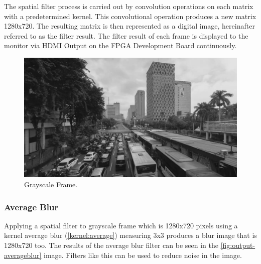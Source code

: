 
The spatial filter process is carried out by convolution operations on each matrix with a predetermined kernel. This convolutional operation produces a new matrix 1280x720. The resulting matrix is then represented as a digital image, hereinafter referred to as the filter result. The filter result of each frame is displayed to the monitor via HDMI Output on the FPGA Development Board continuously.

\begin{figure}[H]
    \includegraphics[width=0.8\linewidth, center]{images/output-image/input1-grayscale.png}
    \caption{Grayscale Frame.}
    \label{fig:input-grayscale}
\end{figure}


\subsubsection{Average Blur}

Applying a spatial filter to grayscale frame which is 1280x720 pixels using a kernel average blur  (\ref{kernel:average}) measuring 3x3 produces a blur image that is 1280x720 too. The results of the average blur filter can be seen in the \ref{fig:output-averageblur} image. Filters like this can be used to reduce noise in the image.

